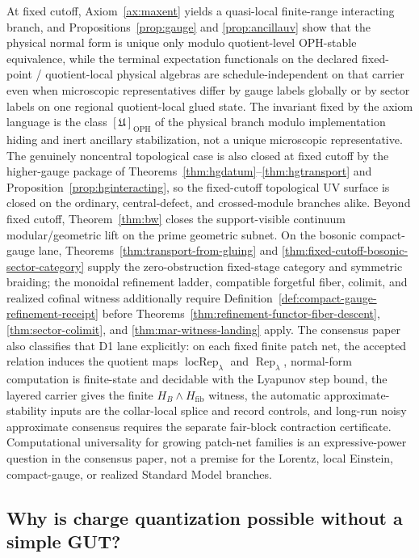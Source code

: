 \documentclass[11pt]{article}
\begin{document}
At fixed cutoff, Axiom~\ref{ax:maxent} yields a quasi-local finite-range interacting branch, and Propositions~\ref{prop:gauge} and \ref{prop:ancillauv} show that the physical normal form is unique only modulo quotient-level OPH-stable equivalence, while the terminal expectation functionals on the declared fixed-point / quotient-local physical algebras are schedule-independent on that carrier even when microscopic representatives differ by gauge labels globally or by sector labels on one regional quotient-local glued state. The invariant fixed by the axiom language is the class \([\mathfrak U]_{\mathrm{OPH}}\) of the physical branch modulo implementation hiding and inert ancillary stabilization, not a unique microscopic representative. The genuinely noncentral topological case is also closed at fixed cutoff by the higher-gauge package of Theorems~\ref{thm:hgdatum}--\ref{thm:hgtransport} and Proposition~\ref{prop:hginteracting}, so the fixed-cutoff topological UV surface is closed on the ordinary, central-defect, and crossed-module branches alike. Beyond fixed cutoff, Theorem~\ref{thm:bw} closes the support-visible continuum modular/geometric lift on the prime geometric subnet. On the bosonic compact-gauge lane, Theorems~\ref{thm:transport-from-gluing} and \ref{thm:fixed-cutoff-bosonic-sector-category} supply the zero-obstruction fixed-stage category and symmetric braiding; the monoidal refinement ladder, compatible forgetful fiber, colimit, and realized cofinal witness additionally require Definition~\ref{def:compact-gauge-refinement-receipt} before Theorems~\ref{thm:refinement-functor-fiber-descent}, \ref{thm:sector-colimit}, and \ref{thm:mar-witness-landing} apply.
The consensus paper also classifies that D1 lane explicitly: on each fixed finite patch net,
the accepted relation induces the quotient maps \(\operatorname{locRep}_\lambda\) and
\(\operatorname{Rep}_\lambda\), normal-form computation is finite-state and decidable with the
Lyapunov step bound, the layered carrier gives the finite \(H_B\wedge H_{\mathrm{fib}}\) witness,
the automatic approximate-stability inputs are the collar-local splice and record controls, and
long-run noisy approximate consensus requires the separate fair-block contraction certificate.
Computational universality for growing patch-net families is an expressive-power question in the
consensus paper, not a premise for the Lorentz, local Einstein, compact-gauge, or realized
Standard Model branches.

\subsection{Why is charge quantization possible without a simple GUT?}
\end{document}
